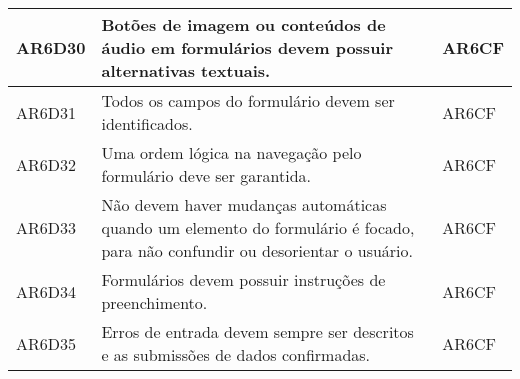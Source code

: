 \begin{table}[htb]
\begin{center}
\begin{tabular}{p{1.2cm}|p{12.0cm}|p{1.5cm}}
      \hline
      AR6D30          & Botões de imagem ou conteúdos de áudio em formulários devem possuir alternativas textuais.                                                   & AR6CF              \\
      \hline
      AR6D31          & Todos os campos do formulário devem ser identificados.                                                                                       & AR6CF              \\
      \hline
      AR6D32          & Uma ordem lógica na navegação pelo formulário deve ser garantida.                                                                            & AR6CF              \\
      \hline
      AR6D33          & Não devem haver mudanças automáticas quando um elemento do formulário é focado, para não confundir ou desorientar o usuário.                 & AR6CF              \\
      \hline
      AR6D34          & Formulários devem possuir instruções de preenchimento.                                                                                       & AR6CF              \\
      \hline
      AR6D35          & Erros de entrada devem sempre ser descritos e as submissões de dados confirmadas.                                                            & AR6CF              \\
    \end{tabular}
  \end{center}
\end{table}
